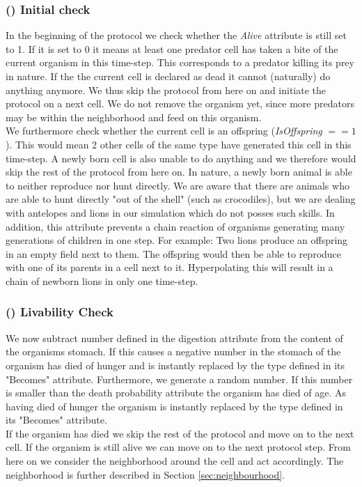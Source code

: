 \documentclass[11pt]{article}
\begin{document}
\subsubsection{() Initial check} 
In the beginning of the protocol we check whether the {\it Alive} attribute is still set to 1. If it is set to 0 it means at least one predator cell has taken a bite of the current organism in this time-step.  This corresponds to a predator killing its prey in nature. If the the current cell is declared as dead it cannot (naturally) do anything anymore. We thus skip the protocol from here on and initiate the protocol on a next cell. We do not remove the organism yet, since more predators may be within the neighborhood and feed on this organism.
\\We furthermore check whether the current cell is an offspring ({\it IsOffspring} $== 1$). This would mean 2 other cells of the same type have generated this cell in this time-step. A newly born cell is also unable to do anything and we therefore would skip the rest of the protocol from here on. In nature, a newly born animal is able to neither reproduce nor hunt directly. We are aware that there are animals who are able to hunt directly "out of the shell" (such as crocodiles), but we are dealing with antelopes and lions in our simulation which do not posses such skills. In addition, this attribute prevents a chain reaction of organisms generating many generations of children in one step. For example: Two lions produce an offspring in an empty field next to them. The offspring would then be able to reproduce with one of its parents in a cell next to it. Hyperpolating this will result in a chain of newborn lions in only one time-step.

\addtocounter{protocolCounter}{1}
\subsubsection{() Livability Check} 
We now subtract number defined in the digestion attribute from the content of the organisms stomach. If this causes a negative number in the stomach of the organism has died of hunger and is instantly replaced by the type defined in its "Becomes" attribute. Furthermore, we generate a random number. If this number is smaller than the death probability attribute the organism has died of age. As having died of hunger the organism is instantly replaced by the type defined in its "Becomes" attribute.\\
If the organism has died we skip the rest of the protocol and move on to the next cell. If the organism is still alive we can move on to the next protocol step. From here on we consider the neighborhood around the cell and act accordingly. The neighborhood is further described in Section \ref{sec:neighbourhood}.
\addtocounter{protocolCounter}{1}
\end{document}
